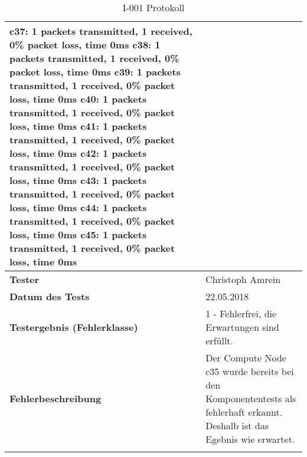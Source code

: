\begin{longtable}{p{4.5cm}p{11.5cm}}
c37: 1 packets transmitted, 1 received, 0\% packet loss, time 0ms \newline
c38: 1 packets transmitted, 1 received, 0\% packet loss, time 0ms \newline
c39: 1 packets transmitted, 1 received, 0\% packet loss, time 0ms \newline
c40: 1 packets transmitted, 1 received, 0\% packet loss, time 0ms \newline
c41: 1 packets transmitted, 1 received, 0\% packet loss, time 0ms \newline
c42: 1 packets transmitted, 1 received, 0\% packet loss, time 0ms \newline
c43: 1 packets transmitted, 1 received, 0\% packet loss, time 0ms \newline
c44: 1 packets transmitted, 1 received, 0\% packet loss, time 0ms \newline
c45: 1 packets transmitted, 1 received, 0\% packet loss, time 0ms \newline  \\\hline
\cellcolor{heading}\textbf{Tester} & Christoph Amrein  \\\hline
\cellcolor{heading}\textbf{Datum des Tests} & 22.05.2018  \\\hline
\cellcolor{heading}\textbf{Testergebnis \newline (Fehlerklasse)} & 1 - Fehlerfrei, die Erwartungen sind erfüllt. \\\hline
\cellcolor{heading}\textbf{Fehlerbeschreibung} &  Der Compute Node c35 wurde bereits bei den Komponententests als fehlerhaft erkannt. Deshalb ist das Egebnis wie erwartet. \\\hline
\caption{I-001 Protokoll}
\end{longtable}

